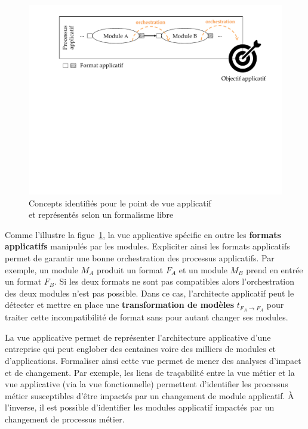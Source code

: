     \begin{figure}[!ht]
     \centering
     \includegraphics[trim= 0cm 11cm 0cm 0cm, clip, width=1\textwidth]{figures/4_demarche/concepts_vue_applicative.pdf}
     \caption{Concepts identifiés pour le point de vue applicatif \\
              et représentés selon un formalisme libre}
     \label{fig:concepts_vue_applicative}
    \end{figure}

    Comme l'illustre la figue~\ref{fig:concepts_vue_applicative}, la vue applicative spécifie
    en outre les \textbf{formats applicatifs} manipulés par les modules. Expliciter
    ainsi les formats applicatifs permet de garantir une bonne orchestration des processus applicatifs. Par
    exemple, un module $M_{A}$ produit un format $F_{A}$ et
    un module $M_{B}$ prend en entrée un format $F_{B}$. Si les deux formats
    ne sont pas compatibles alors l'orchestration des deux modules n'est pas possible.
    Dans ce cas, l'architecte applicatif peut le détecter et mettre en place une \textbf{transformation de
    modèles} $t_{F_{A} \rightarrow F_{A}}$ pour traiter cette incompatibilité de format sans pour
    autant changer ses modules.

    La vue applicative permet de représenter l'architecture applicative d'une entreprise qui peut englober
    des centaines voire des milliers de modules et d'applications. Formaliser ainsi cette vue permet de mener
    des analyses d'impact et de changement. Par exemple, les liens de traçabilité entre la vue métier et la
    vue applicative (via la vue fonctionnelle) permettent d'identifier les processus métier susceptibles d'être
    impactés par un changement de module applicatif. À l'inverse, il est possible d'identifier les modules
    applicatif impactés par un changement de processus métier.

